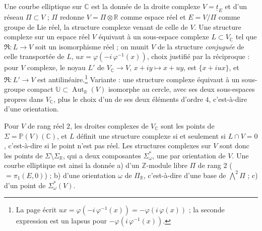 \documentclass[11pt,a4paper]{article}
\begin{document}
Une courbe elliptique sur $\mathbb{C}$ est la donnée de la droite complexe $V =
\underline{t}_E$ et d'un réseau $\Pi \subset V$ ; $\Pi$ redonne $V = \Pi \otimes
\mathbb{R}$ comme espace réel et $E = V/\Pi$ comme groupe de Lie réel, la
structure complexe venant de celle de $V$. Une structure complexe sur un espace
réel $V$ équivaut à un sous-espace complexe $L \subset V_{\mathbb{C}}$ tel que
$\Re : L \to V$ soit un isomorphisme réel ; on munit $V$ de la structure
\emph{conjuguée} de celle transportée de $L$, $u x = \varphi(-i\, \varphi^{-1}(x))$,
choix justifié par la réciproque : pour $V$ complexe, le noyau $L'$ de
$V_{\mathbb{C}} \to V$, $x + iy \mapsto x + uy$, est $\{x + iux\}$, et $\Re :
L' \to V$ est antilinéaire.\footnote{La page écrit $u x = \varphi(-i\,
\varphi^{-1}(x)) = -\varphi(i\,\varphi(x))$ ; la seconde expression est un lapsus
pour $-\varphi(i\, \varphi^{-1}(x))$.} Variante : une structure complexe équivaut
à un sous-groupe compact $\mathbb{U} \subset \operatorname{Aut}_{\mathbb{R}}(V)$
isomorphe au cercle, avec ses deux sous-espaces propres dans $V_{\mathbb{C}}$,
plus le choix d'un de ses deux éléments d'ordre $4$, c'est-à-dire d'une
orientation.

Pour $V$ de rang réel $2$, les droites complexes de $V_{\mathbb{C}}$ sont les
points de $\Sigma = \mathbb{P}(V)(\mathbb{C})$, et $L$ définit une structure
complexe si et seulement si $L \cap V = 0$, c'est-à-dire si le point n'est pas
réel. Les structures complexes sur $V$ sont donc les points de $\Sigma \setminus
\Sigma_{\mathbb{R}}$, qui a deux composantes $\Sigma^{*}_\omega$, une par
orientation de $V$. Une courbe elliptique est ainsi la donnée a) d'un
$\mathbb{Z}$-module libre $\Pi$ de rang $2$ ($= \pi_1(E, 0)$) ; b) d'une
orientation $\omega$ de $\Pi_{\mathbb{R}}$, c'est-à-dire d'une base de
$\bigwedge^2 \Pi$ ; c) d'un point de $\Sigma^{*}_\omega(V)$.
\end{document}
